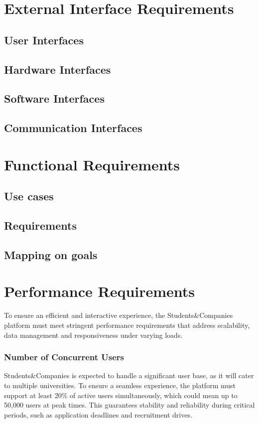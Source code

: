 \section{External Interface Requirements}
\subsection{User Interfaces}
\subsection{Hardware Interfaces}
\subsection{Software Interfaces}
\subsection{Communication Interfaces}
\section{Functional Requirements}
\subsection{Use cases}
\subsection{Requirements}
\subsection{Mapping on goals}
\section{Performance Requirements}
To ensure an efficient and interactive experience, the Students\&Companies platform must meet stringent performance requirements that address scalability, data management and responsiveness under varying loads.

\subsubsection{Number of Concurrent Users}
Students\&Companies is expected to handle a significant user base, as it will cater to multiple universities.
To ensure a seamless experience, the platform must support at least 20\% of active users simultaneously, which could mean up to 50,000 users at peak times.
This guarantees stability and reliability during critical periods, such as application deadlines and recruitment drives.

